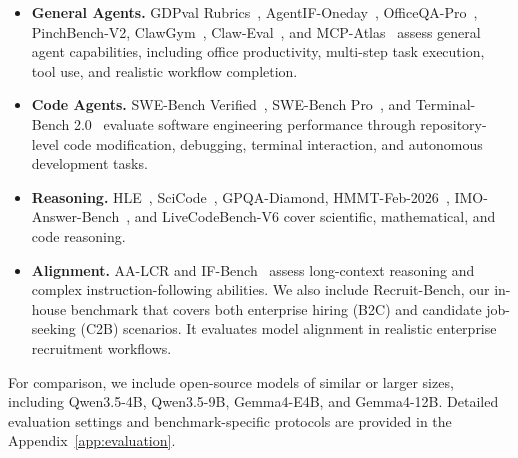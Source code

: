 \begin{itemize}[leftmargin=10pt]

\item \textbf{General Agents.}
GDPval Rubrics~\cite{fry2025gdpval}, AgentIF-Oneday~\cite{chen2026agentifoneday}, OfficeQA-Pro~\cite{opsahlong2026officeqa}, PinchBench-V2, ClawGym~\cite{bai2026clawgym}, Claw-Eval~\cite{ye2026claw}, and MCP-Atlas~\cite{bandi2026mcpatlas} assess general agent capabilities, including office productivity, multi-step task execution, tool use, and realistic workflow completion.

\item \textbf{Code Agents.}
SWE-Bench Verified~\cite{jimenez2024swebench}, SWE-Bench Pro~\cite{deng2025swebenchpro}, and Terminal-Bench 2.0~\cite{merrill2026terminalbench} evaluate software engineering performance through repository-level code modification, debugging, terminal interaction, and autonomous development tasks.

\item \textbf{Reasoning.}
HLE~\cite{phan2025humanitysexam}, SciCode~\cite{tian2024scicode}, GPQA-Diamond, HMMT-Feb-2026~\cite{dekoninck2026matharena}, IMO-Answer-Bench~\cite{luong2025towards}, and LiveCodeBench-V6 cover scientific, mathematical, and code reasoning.

\item \textbf{Alignment.}
AA-LCR and IF-Bench~\cite{pyatkin2025generalizing} assess long-context reasoning and complex instruction-following abilities. We also include Recruit-Bench, our in-house benchmark that covers both enterprise hiring (B2C) and candidate job-seeking (C2B) scenarios. It evaluates model alignment in realistic enterprise recruitment workflows. 

\end{itemize}


For comparison, we include open-source models of similar or larger sizes, including Qwen3.5-4B, Qwen3.5-9B, Gemma4-E4B, and Gemma4-12B. Detailed evaluation settings and benchmark-specific protocols are provided in the Appendix~\ref{app:evaluation}.



